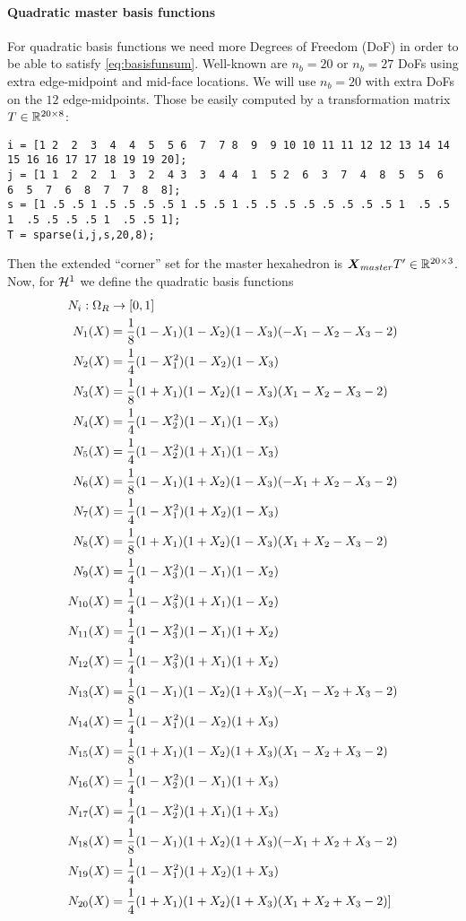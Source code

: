 \paragraph{Quadratic master basis functions}
For quadratic basis functions we need more Degrees of Freedom (DoF) in order to be able to satisfy \eqref{eq:basisfunsum}.
Well-known are $n_b=20$ or $n_b=27$ DoFs using extra edge-midpoint and mid-face locations.
We will use $n_b = 20$ with extra DoFs on the $12$ edge-midpoints.
Those be easily computed by a transformation matrix $T\in\mathbb{R}^{20 \times 8}$: 
\begin{lstlisting}
i = [1 2  2  3  4  4  5  5 6  7  7 8  9  9 10 10 11 11 12 12 13 14 14 15 16 16 17 17 18 19 19 20];  
j = [1 1  2  2  1  3  2  4 3  3  4 4  1  5 2  6  3  7  4  8  5  5  6  6  5  7  6  8  7  7  8  8];
s = [1 .5 .5 1 .5 .5 .5 .5 1 .5 .5 1 .5 .5 .5 .5 .5 .5 .5 .5 1  .5 .5 1  .5 .5 .5 .5 1  .5 .5 1];
T = sparse(i,j,s,20,8);
\end{lstlisting}
Then the extended ``corner'' set for the master hexahedron is $\boldsymbol{X}_{master}T' \in\mathbb{R}^{20\times 3}$.
Now, for $\mathcal{H}^1$ we define the quadratic basis functions
\begin{align*}
	N_i:\Om &\to [0,1]\\
	N_1(X)  &= \frac{1}{8}(1-X_1)(1-X_2)(1-X_3)(-X_1-X_2-X_3-2)\\ %
    N_2(X)  &= \frac{1}{4}(1-X_1^2)(1-X_2)(1-X_3)\\ %
    N_3(X)  &= \frac{1}{8}(1+X_1)(1-X_2)(1-X_3)(X_1-X_2-X_3-2)\\ %
    N_4(X) &= \frac{1}{4}(1-X_2^2)(1-X_1)(1-X_3)\\ %
    N_5(X) &= \frac{1}{4}(1-X_2^2)(1+X_1)(1-X_3)\\ %
    N_6(X) &= \frac{1}{8}(1-X_1)(1+X_2)(1-X_3)(-X_1+X_2-X_3-2)\\ %
    N_7(X) &= \frac{1}{4}(1-X_1^2)(1+X_2)(1-X_3)\\ %
    N_8(X) &= \frac{1}{8}(1+X_1)(1+X_2)(1-X_3)(X_1+X_2-X_3-2)\\ %
    N_9(X) &= \frac{1}{4}(1-X_3^2)(1-X_1)(1-X_2)\\ %
    N_{10}(X) &= \frac{1}{4}(1-X_3^2)(1+X_1)(1-X_2)\\ %
    N_{11}(X) &= \frac{1}{4}(1-X_3^2)(1-X_1)(1+X_2)\\ %
    N_{12}(X) &= \frac{1}{4}(1-X_3^2)(1+X_1)(1+X_2)\\ %
    N_{13}(X) &= \frac{1}{8}(1-X_1)(1-X_2)(1+X_3)(-X_1-X_2+X_3-2)\\ %
    N_{14}(X) &= \frac{1}{4}(1-X_1^2)(1-X_2)(1+X_3)\\ %
    N_{15}(X) &= \frac{1}{8}(1+X_1)(1-X_2)(1+X_3)(X_1-X_2+X_3-2)\\ %
    N_{16}(X) &= \frac{1}{4}(1-X_2^2)(1-X_1)(1+X_3)\\ %
    N_{17}(X) &= \frac{1}{4}(1-X_2^2)(1+X_1)(1+X_3)\\ %
    N_{18}(X) &= \frac{1}{8}(1-X_1)(1+X_2)(1+X_3)(-X_1+X_2+X_3-2)\\ %
    N_{19}(X) &= \frac{1}{4}(1-X_1^2)(1+X_2)(1+X_3)\\ %
    N_{20}(X) &= \frac{1}{4}(1+X_1)(1+X_2)(1+X_3)(X_1+X_2+X_3-2)]\\
\end{align*}
